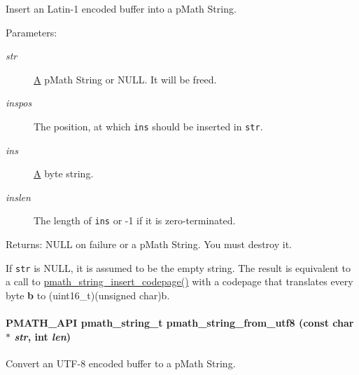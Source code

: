 Insert an Latin-1 encoded buffer into a pMath String. 

\begin{Desc}
\item[Parameters:]
\begin{description}
\item[{\em str}]\hyperlink{class_a}{A} pMath String or NULL. It will be freed. \item[{\em inspos}]The position, at which {\tt ins} should be inserted in {\tt str}. \item[{\em ins}]\hyperlink{class_a}{A} byte string. \item[{\em inslen}]The length of {\tt ins} or -1 if it is zero-terminated. \end{description}
\end{Desc}
\begin{Desc}
\item[Returns:]NULL on failure or a pMath String. You must destroy it.\end{Desc}
If {\tt str} is NULL, it is assumed to be the empty string. The result is equivalent to a call to \hyperlink{group__strings_g5008b0b2e682b283772e10bf38666ffe}{pmath\_\-string\_\-insert\_\-codepage()} with a codepage that translates every byte {\bf b} to {\bf }(uint16\_\-t)(unsigned char)b. \hypertarget{group__strings_g0591f864ff17f7c27dc7b5032dab7551}{
\paragraph[{pmath\_\-string\_\-from\_\-utf8}]{\setlength{\rightskip}{0pt plus 5cm}PMATH\_\-API {\bf pmath\_\-string\_\-t} pmath\_\-string\_\-from\_\-utf8 (const char $\ast$ {\em str}, \/  int {\em len})}\hfill}
\label{group__strings_g0591f864ff17f7c27dc7b5032dab7551}


Convert an UTF-8 encoded buffer to a pMath String. 

